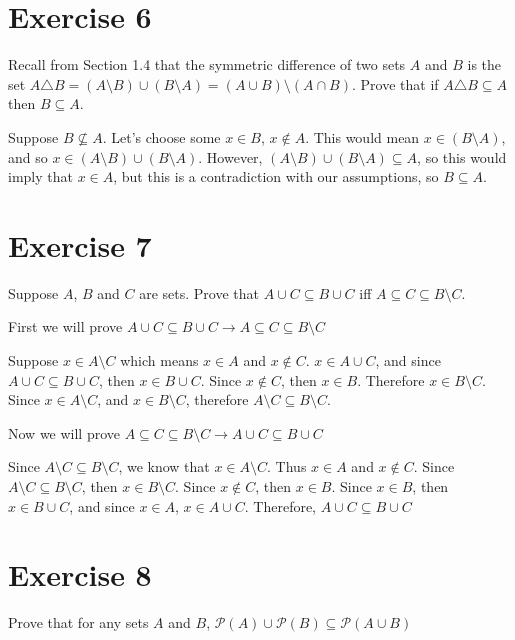 \documentclass[11pt]{article}
\newcommand{\then}{\rightarrow}
\newcommand{\powerset}[1]{\mathscr{P}(#1)}
\begin{document}
\section*{Exercise 6}

Recall from Section 1.4 that the symmetric difference of two sets $A$ and $B$ is 
the set $A \triangle B = (A \setminus B) \cup (B \setminus A) = 
(A \cup B) \setminus (A \cap B)$. Prove that if $A \triangle B \subseteq A$ then 
$B \subseteq A$.

Suppose $B \nsubseteq A$. Let's choose some $x \in B$, $x \notin A$. This would 
mean $x \in (B \setminus A)$, and so $x \in (A \setminus B) \cup (B \setminus A)$.
However, $(A \setminus B) \cup (B \setminus A) \subseteq A$, so this would imply 
that $x \in A$, but this is a contradiction with our assumptions, so 
$B \subseteq A$.

\section*{Exercise 7}

Suppose $A$, $B$ and $C$ are sets. Prove that $A \cup C \subseteq B \cup C$ iff 
$A \subseteq C \subseteq B \setminus C$.

First we will prove $A \cup C \subseteq B \cup C \then A \subseteq C \subseteq B \setminus C$

Suppose $x \in A \setminus C$ which means $x \in A$ and $x \notin C$. $x \in A \cup C$,
and since $A \cup C \subseteq B \cup C$, then $x \in B \cup C$. Since $x \notin C$, then 
$x \in B$. Therefore $x \in B \setminus C$. Since $x \in A \setminus C$, and 
$x \in B \setminus C$, therefore $A \setminus C \subseteq B \setminus C$.

Now we will prove $A \subseteq C \subseteq B \setminus C \then A \cup C \subseteq B \cup C$

Since $A \setminus C \subseteq B \setminus C$, we know that $x \in A \setminus C$.
Thus $x \in A$ and $x \notin C$. Since $A \setminus C \subseteq B \setminus C$, then 
$x \in B \setminus C$. Since $x \notin C$, then $x \in B$. Since $x \in B$, then 
$x \in B \cup C$, and since $x \in A$, $x \in A \cup C$. 
Therefore, $A \cup C \subseteq B \cup C$

\section*{Exercise 8}

Prove that for any sets $A$ and $B$, $\powerset{A} \cup \powerset{B} \subseteq \powerset{A \cup B}$
\end{document}
